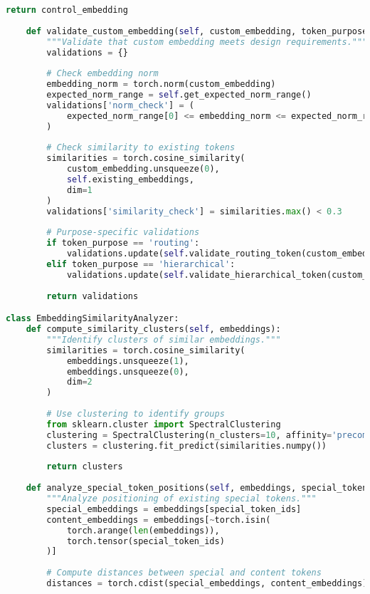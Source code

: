 \begin{lstlisting}[language=Python, caption=Embedding space analysis for custom token design]
        return control_embedding
    
    def validate_custom_embedding(self, custom_embedding, token_purpose):
        """Validate that custom embedding meets design requirements."""
        validations = {}
        
        # Check embedding norm
        embedding_norm = torch.norm(custom_embedding)
        expected_norm_range = self.get_expected_norm_range()
        validations['norm_check'] = (
            expected_norm_range[0] <= embedding_norm <= expected_norm_range[1]
        )
        
        # Check similarity to existing tokens
        similarities = torch.cosine_similarity(
            custom_embedding.unsqueeze(0),
            self.existing_embeddings,
            dim=1
        )
        validations['similarity_check'] = similarities.max() < 0.3
        
        # Purpose-specific validations
        if token_purpose == 'routing':
            validations.update(self.validate_routing_token(custom_embedding))
        elif token_purpose == 'hierarchical':
            validations.update(self.validate_hierarchical_token(custom_embedding))
        
        return validations

class EmbeddingSimilarityAnalyzer:
    def compute_similarity_clusters(self, embeddings):
        """Identify clusters of similar embeddings."""
        similarities = torch.cosine_similarity(
            embeddings.unsqueeze(1),
            embeddings.unsqueeze(0),
            dim=2
        )
        
        # Use clustering to identify groups
        from sklearn.cluster import SpectralClustering
        clustering = SpectralClustering(n_clusters=10, affinity='precomputed')
        clusters = clustering.fit_predict(similarities.numpy())
        
        return clusters
    
    def analyze_special_token_positions(self, embeddings, special_token_ids):
        """Analyze positioning of existing special tokens."""
        special_embeddings = embeddings[special_token_ids]
        content_embeddings = embeddings[~torch.isin(
            torch.arange(len(embeddings)), 
            torch.tensor(special_token_ids)
        )]
        
        # Compute distances between special and content tokens
        distances = torch.cdist(special_embeddings, content_embeddings)
        

\end{lstlisting}
